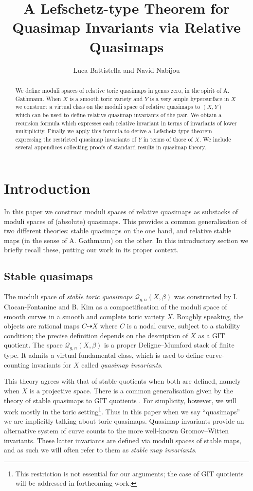 \documentclass[11pt]{amsart}
\title[Quasimap Lefschetz via Relative Quasimaps]{A Lefschetz-type Theorem for Quasimap Invariants via Relative Quasimaps}
\author{Luca Battistella and Navid Nabijou}
\newcommand{\Q}[4]{\mathcal{Q}_{#1,#2}(#3,#4)}
\theoremstyle{definition}
\theoremstyle{definition}
\newcommand{\ilemph}[1]{\emph{#1}}
\begin{document}
\begin{abstract} We define moduli spaces of relative toric quasimaps in genus zero, in the spirit of A. Gathmann. When $X$ is a smooth toric variety and $Y$ is a very ample hypersurface in $X$ we construct a virtual class on the moduli space of relative quasimaps to $(X,Y)$ which can be used to define relative quasimap invariants of the pair. We obtain a recursion formula which expresses each relative invariant in terms of invariants of lower multiplicity. Finally we apply this formula to derive a Lefschetz-type theorem expressing the restricted quasimap invariants of $Y$ in terms of those of $X$. We include several appendices collecting proofs of standard results in quasimap theory. \end{abstract}

\maketitle
\appendixtitletocoff
\tableofcontents

\section{Introduction}
In this paper we construct moduli spaces of relative quasimaps as substacks of moduli spaces of (absolute) quasimaps. This provides a common generalisation of two different theories: stable quasimaps on the one hand, and relative stable maps (in the sense of A. Gathmann) on the other. In this introductory section we briefly recall these, putting our work in its proper context.

\subsection{Stable quasimaps}
The moduli space of \ilemph{stable toric quasimaps} $\Q{g}{n}{X}{\beta}$ was constructed by I. Ciocan-Fontanine and B. Kim \cite{CF-K} as a compactification of the moduli space of smooth curves in a smooth and complete toric variety $X$. Roughly speaking, the objects are rational maps $C \dashrightarrow X$ where $C$ is a nodal curve, subject to a stability condition; the precise definition depends on the description of $X$ as a GIT quotient.  The space $\Q{g}{n}{X}{\beta}$ is a proper Deligne--Mumford stack of finite type.  It admits a virtual fundamental class, which is used to define curve-counting invariants for $X$ called \ilemph{quasimap invariants}.

This theory agrees with that of stable quotients \cite{MOP} when both are defined, namely when $X$ is a projective space.  There is a common generalisation given by the theory of stable quasimaps to GIT quotients \cite{CFKM}. For simplicity, however, we will work mostly in the toric setting\footnote{This restriction is not essential for our arguments; the case of GIT quotients will be addressed in forthcoming work.}. Thus in this paper when we say ``quasimaps'' we are implicitly talking about toric quasimaps.
Quasimap invariants provide an alternative system of curve counts to the more well-known Gromov--Witten invariants. These latter invariants are defined via moduli spaces of stable maps, and as such we will often refer to them as \emph{stable map invariants}.
\end{document}
